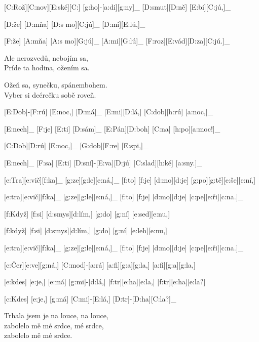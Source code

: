 
{\minw=6mm
[C:Rož][C:nov][E:ské][C:] [g:ho]-[a:di][g:ny]_
[D:smut][D:ně] [E:bi][C:jú,]_

[D:že] [D:mňa] [D:s mo][C:jú]_ [D:mi][E:lú,]_

[F:že] [A:mňa] [A:s mo][G:jú]_ [A:mi][G:lú]_
[F:roz][E:vád][D:za][C:jú.]_
}

Ale nerozvedů, nebojím sa,\\
Príde ta hodina, ožením sa.

Ožeň sa, synečku, spánembohem.\\
Vyber si dcérečku sobě roveň.



[E:Dob]-[F:rú] [E:noc,] [D:má]_ [E:mi][D:lá,] [C:dob][h:rú] [a:noc,]_

[E:nech]_ [F:je] [E:ti] [D:sám]_ [E:Pán][D:boh] [C:na] [h:po][a:moc!]_

[C:Dob][D:rú] [E:noc,]_ [G:dob][F:re] [E:spi,]_

[E:nech]_ [F:sa] [E:ti] [D:sní]-[E:va][D:jú] [C:slad][h:ké] [a:sny.]_



[e:Tra][e:vič][f:ka]_ [g:ze][g:le][e:ná,]_
[f:to] [f:je] [d:mo][d:je] [g:po][g:tě][e:še][e:ní,]

[e:tra][e:vič][f:ka]_ [g:ze][g:le][e:ná,]_
[f:to] [f:je] [d:mo][d:je] [c:pe][e:ři][c:na.]_

[f:Když] [f:si] [d:smys][d:lím,] [g:do] [g:ní] [e:sed][e:nu,]

[f:když] [f:si] [d:smys][d:lím,] [g:do] [g:ní] [e:leh][e:nu,]

[e:tra][e:vič][f:ka]_ [g:ze][g:le][e:ná,]_
[f:to] [f:je] [d:mo][d:je] [c:pe][e:ři][c:na.]_



[c:Čer][e:ve][g:ná,] [C:mod]-[a:rá] [a:fi][g:a][g:la,] [a:fi][g:a][g:la,]

[e:kdes] [e:je,] [e:má] [g:mi]-[d:lá,] [f:tr][e:ha][e:la,] [f:tr][e:ha][e:la?]

[c:Kdes] [e:je,] [g:má] [C:mi]-[E:lá,] [D:tr]-[D:ha][C:la?]_

Trhala jsem je na louce, na louce,\\
zabolelo mě mé srdce, mé srdce,\\
zabolelo mě mé srdce.




